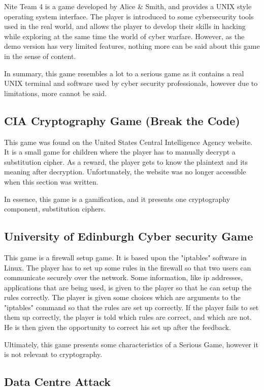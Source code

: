 \documentclass{l4proj}
\begin{document}
Nite Team 4 is a game developed by Alice \& Smith, and provides a UNIX style operating system interface. 
The player is introduced to some cybersecurity tools used in the real world, 
and allows the player to develop their skills in hacking while exploring at the same time the world of cyber warfare.
However, as the demo version has very limited features, nothing more can be said about this game in the sense of content.

In summary, this game resembles a lot to a serious game as it contains a real UNIX terminal and software used by cyber security professionals, 
however due to limitations, more cannot be said.

\subsection{CIA Cryptography Game (Break the Code)}

This game was found on the United States Central Intelligence Agency website. 
It is a small game for children where the player has to manually decrypt a substitution cipher. 
As a reward, the player gets to know the plaintext and its meaning after decryption.
Unfortunately, the website was no longer accessible when this section was written. 

In essence, this game is a gamification, and it presents one cryptography component, substitution ciphers. 

\subsection{University of Edinburgh Cyber security Game}

This game is a firewall setup game. It is based upon the "iptables" software in Linux. 
The player has to set up some rules in the firewall so that two users can communicate securely over the network.
Some information, like ip addresses, applications that are being used, is given to the player so that he can setup the rules correctly.
The player is given some choices which are arguments to the "iptables" command so that the rules are set up correctly.
If the player fails to set them up correctly, the player is told which rules are correct, and which are not. 
He is then given the opportunity to correct his set up after the feedback.

Ultimately, this game presents some characteristics of a Serious Game, however it is not relevant to cryptography.

\subsection{Data Centre Attack}
\end{document}
